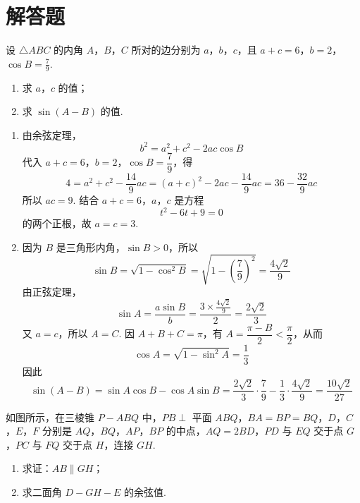 \section{解答题}

\begin{problem}
设 \(\triangle ABC\) 的内角 \(A\)，\(B\)，\(C\) 所对的边分别为 \(a\)，\(b\)，\(c\)，且 \(a + c = 6\)，\(b = 2\)，\(\cos B = \frac{7}{9}\).
\begin{enumerate}
\item 求 \(a\)，\(c\) 的值；
\item 求 \(\sin (A - B)\) 的值.
\end{enumerate}
\end{problem}

\begin{solution}
\begin{enumerate}
\item
由余弦定理，
\[
b^2=a^2+c^2-2ac\cos B
\]
代入 \(a+c=6\)，\(b=2\)，\(\cos B=\dfrac{7}{9}\)，得
\[
4=a^2+c^2-\frac{14}{9}ac
=(a+c)^2-2ac-\frac{14}{9}ac
=36-\frac{32}{9}ac
\]
所以 \(ac=9\). 结合 \(a+c=6\)，\(a\)，\(c\) 是方程
\[
t^2-6t+9=0
\]
的两个正根，故 \(a=c=3\).

\item
因为 \(B\) 是三角形内角，\(\sin B>0\)，所以
\[
\sin B=\sqrt{1-\cos^2B}
=\sqrt{1-\left(\frac{7}{9}\right)^2}
=\frac{4\sqrt{2}}{9}
\]
由正弦定理，
\[
\sin A=\frac{a\sin B}{b}
=\frac{3\times\frac{4\sqrt{2}}{9}}{2}
=\frac{2\sqrt{2}}{3}
\]
又 \(a=c\)，所以 \(A=C\). 因 \(A+B+C=\pi\)，有 \(A=\dfrac{\pi-B}{2}<\dfrac{\pi}{2}\)，从而
\[
\cos A=\sqrt{1-\sin^2A}=\frac{1}{3}
\]
因此
\[
\sin(A-B)=\sin A\cos B-\cos A\sin B
=\frac{2\sqrt{2}}{3}\cdot\frac{7}{9}
-\frac{1}{3}\cdot\frac{4\sqrt{2}}{9}
=\frac{10\sqrt{2}}{27}
\]
\end{enumerate}
\end{solution}

\begin{problem}
如图所示，在三棱锥 \(P - ABQ\) 中，\(PB \perp\) 平面 \(ABQ\)，\(BA = BP = BQ\)，\(D\)，\(C\)，\(E\)，\(F\) 分别是 \(AQ\)，\(BQ\)，\(AP\)，\(BP\) 的中点，\(AQ = 2BD\)，\(PD\) 与 \(EQ\) 交于点 \(G\)，\(PC\) 与 \(FQ\) 交于点 \(H\)，连接 \(GH\).
\begin{enumerate}
\item 求证：\(AB \parallel GH\)；
\item 求二面角 \(D - GH - E\) 的余弦值.
\end{enumerate}
\end{problem}


